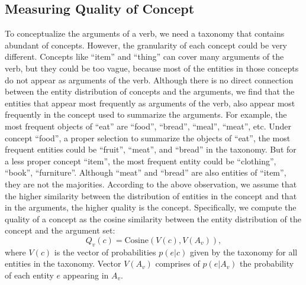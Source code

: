 \subsection{Measuring Quality of Concept}
To conceptualize the arguments of a verb, we need a taxonomy that contains
abundant of concepts. However, the granularity of each concept could be
very different. Concepts like ``item'' and ``thing'' can cover many arguments
of the verb, but they could be too vague, because most of the entities in those
concepts do not appear as arguments of the verb. Although there
is no direct connection between the entity distribution of concepts and
the arguments, we find that the entities that appear most frequently
as arguments of the verb, also appear most frequently in the concept used
to summarize the arguments. For example, the most frequent objects of ``eat''
are ``food'', ``bread'', ``meal'', ``meat'', etc. Under concept ``food'',
a proper selection to summarize the objects of ``eat'', the most frequent entities
could be ``fruit'', ``meat'', and ``bread'' in the taxonomy. But for a less
proper concept ``item'', the most frequent entity could be ``clothing'', ``book'',
``furniture''. Although ``meat'' and ``bread'' are also entities of ``item'',
they are not the majorities. According to the above observation, we assume that
the higher similarity between the distribution of entities in the concept and
that in the arguments, the higher quality is the concept.
Specifically, we compute the quality of a concept as the cosine similarity between the
entity distribution of the concept and the argument set:
\begin{equation}
Q_v(c)=\text{Cosine}(V(c),V(A_v)),
\label{eq:qc}
\end{equation}
where $V(c)$ is the vector of probabilities $p(e|c)$ given by the taxonomy
for all entities in the taxonomy.
Vector $V(A_v)$ comprises of $p(e|A_v)$ the probability of each entity $e$
appearing in $A_v$.


